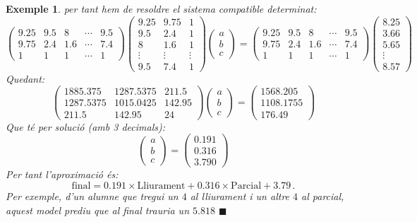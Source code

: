 \documentclass[
  11pt,
]{book}
\numberwithin{dummy}{section}
\theoremstyle{maincolornumbox}
\theoremstyle{blacknumex}
\newtheorem{exampleT}{Exemple}[chapter]
\theoremstyle{blacknumbox}
\theoremstyle{maincolornum}
\newenvironment{example}{\begin{exampleT}}{\hfill{\tiny\ensuremath{\blacksquare}}\end{exampleT}}
\begin{document}
\begin{example}
per tant hem de resoldre el sistema compatible determinat:
\[\begin{pmatrix}
9.25 & 9.5 & 8 & \cdots & 9.5 \\
9.75 & 2.4 & 1.6 & \cdots & 7.4 \\
1 & 1 & 1 & \cdots & 1
\end{pmatrix}
\begin{pmatrix}
9.25 & 9.75 & 1 \\
9.5 & 2.4 & 1 \\
8 & 1.6 & 1 \\
\vdots & \vdots & \vdots \\
9.5 & 7.4 & 1
\end{pmatrix}
\begin{pmatrix} a \\ b \\ c \end{pmatrix}=
\begin{pmatrix}
9.25 & 9.5 & 8 & \cdots & 9.5 \\
9.75 & 2.4 & 1.6 & \cdots & 7.4 \\
1 & 1 & 1 & \cdots & 1
\end{pmatrix}
\begin{pmatrix} 8.25 \\ 3.66 \\ 5.65 \\ \vdots \\ 8.57 \end{pmatrix}\]
Quedant: \[\left(\begin{array}{ccc}
1885.375 & 1287.5375 & 211.5 \\
1287.5375 & 1015.0425 & 142.95 \\
211.5 & 142.95 & 24
\end{array}\right)
\begin{pmatrix} a \\ b \\ c \end{pmatrix}=
\begin{pmatrix}
1568.205 \\ 1108.1755 \\ 176.49
\end{pmatrix}\] Que té per solució (amb 3 decimals):
\[\begin{pmatrix} a \\ b \\ c \end{pmatrix}=
\begin{pmatrix} 0.191 \\
0.316 \\
3.790 \end{pmatrix}\] Per tant l'aproximació és:
\[\text{final} = 0.191 \times \text{Lliurament} + 0.316 \times \text{Parcial} + 3.79\, .\]
Per exemple, d'un alumne que tregui un \(4\) al lliurament i un altre \(4\)
al parcial, aquest model prediu que al final trauria un \(5.818\)
\end{example}
\end{document}
